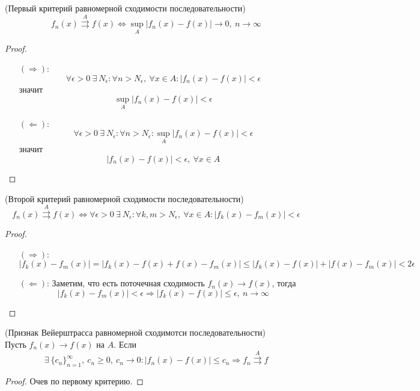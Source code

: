 \begin{theorem} (Первый критерий равномерной сходимости последовательности)\\
    \[f_n(x) \overset{A}{\rightrightarrows} f(x) \Leftrightarrow \sup\limits_A|f_n(x)-f(x)|\to 0,\ n\to \infty\]
\end{theorem}
\begin{proof}\tab
    \begin{itemize}
        \item [$(\Rightarrow)$:] 
        \[\forall \epsilon>0\ \exists\ N_{\epsilon}: \forall n>N_{\epsilon},\ \forall x\in A: |f_n(x)-f(x)|<\epsilon\]
        значит
        \[\sup\limits_A|f_n(x)-f(x)|<\epsilon\]
        \item[$(\Leftarrow)$:]
        \[\forall \epsilon>0\ \exists\ N_{\epsilon}: \forall n>N_{\epsilon}: \sup\limits_A|f_n(x)-f(x)|<\epsilon\]
        значит
        \[|f_n(x)-f(x)|<\epsilon,\ \forall x\in A\]
    \end{itemize}
\end{proof}
\begin{theorem} (Второй критерий равномерной сходимости последовательности)\\
    \[f_n(x)\overset{A}{\rightrightarrows} f(x) \Leftrightarrow \forall \epsilon>0\ \exists\ N_{\epsilon}: \forall k,m>N_{\epsilon},\ \forall x\in A: |f_k(x)-f_m(x)|<\epsilon\]
\end{theorem}
\begin{proof}\tab
    \begin{itemize}
        \item[$(\Rightarrow)$:] 
        \[|f_k(x)-f_m(x)|=|f_k(x)-f(x)+f(x)-f_m(x)|\leq |f_k(x)-f(x)|+|f(x)-f_m(x)|<2\epsilon\]
        \item[$(\Leftarrow)$:]
        Заметим, что есть поточечная сходимость $f_n(x)\to f(x)$, тогда
        \[|f_k(x)-f_m(x)|<\epsilon \Rightarrow |f_k(x)-f(x)|\leq \epsilon,\ n\to \infty\]
    \end{itemize}    
\end{proof}
\begin{theorem} (Признак Вейерштрасса равномерной сходимотси последовательности)\\
    Пусть $f_n(x)\to f(x)$ на $A$. Если 
    \[\exists\ \{c_n\}_{n=1}^{\infty},\ c_n\geq 0,\ c_n\to 0: |f_n(x)-f(x)|\leq c_n \Rightarrow f_n\overset{A}{\rightrightarrows} f\]
\end{theorem}
\begin{proof}
    Очев по первому критерию.
\end{proof}